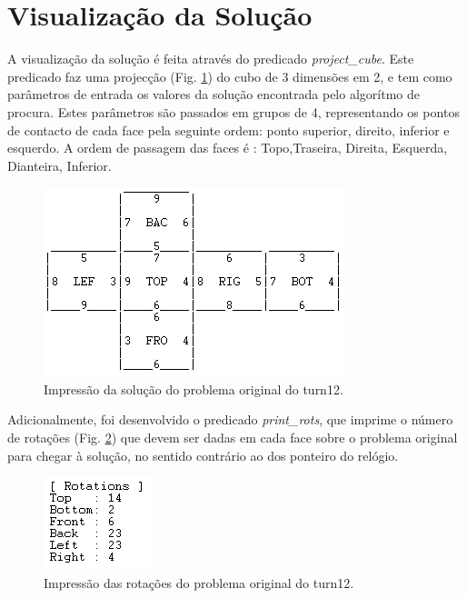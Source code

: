 
\section{Visualização da Solução}
\label{rest:5}

A visualização da solução é feita através do predicado \textit{project\_cube}.
Este predicado faz uma projecção (Fig. \ref{fig:2}) do cubo de 3 dimensões em 2, e tem como parâmetros de entrada os valores da solução encontrada pelo algorítmo de procura. Estes parâmetros são passados em grupos de 4, representando os pontos de contacto de cada face pela seguinte ordem: ponto superior, direito, inferior e esquerdo. 
A ordem de passagem das faces é : Topo,Traseira, Direita, Esquerda, Dianteira, Inferior.

\begin{figure}[H]
\begin{center}
\includegraphics[scale=0.6]{resol.png}
\caption{Impressão da solução do problema original do turn12.}
\label{fig:2}
\end{center}
\end{figure}

Adicionalmente, foi desenvolvido o predicado \textit{print\_rots}, que imprime o número de rotações (Fig. \ref{fig:3})  que devem ser dadas em cada face sobre o problema original para chegar à solução, no sentido contrário ao dos ponteiro do relógio.

\begin{figure}[H]
\begin{center}
\includegraphics[scale=0.6]{rots.png}
\caption{Impressão das rotações do problema original do turn12.}
\label{fig:3}
\end{center}
\end{figure}

